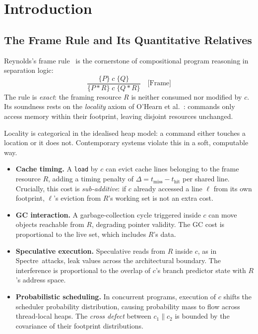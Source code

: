 \documentclass[acmsmall,sigplan,anonymous,review,screen]{acmart}
\newcommand{\inferrule}[2]{%
  \dfrac{\displaystyle #1}{\displaystyle #2}%
}
\theoremstyle{plain}
\theoremstyle{definition}
\newcommand{\sep}{*}
\begin{document}
\section{Introduction}
\label{sec:intro}

\subsection{The Frame Rule and Its Quantitative Relatives}
\label{sec:intro:frame}

Reynolds's frame rule~\cite{reynolds2002separation} is the cornerstone of
compositional program reasoning in separation logic:
\begin{equation}
  \label{eq:frame}
  \inferrule{\{P\}\;c\;\{Q\}}{\{P \sep R\}\;c\;\{Q \sep R\}} \quad\text{[Frame]}
\end{equation}
The rule is \emph{exact}: the framing resource $R$ is neither consumed
nor modified by $c$.  Its soundness rests on the \emph{locality} axiom of
O'Hearn et al.~\cite{ohearn2001local}: commands only access memory within
their footprint, leaving disjoint resources unchanged.

Locality is categorical in the idealised heap model: a command either
touches a location or it does not.  Contemporary systems violate this
in a soft, computable way.

\begin{itemize}[leftmargin=1.5em,itemsep=2pt]
  \item \textbf{Cache timing.}
    A \texttt{load} by $c$ can evict cache lines belonging to the frame
    resource $R$, adding a timing penalty of $\Delta = t_{\mathrm{miss}} -
    t_{\mathrm{hit}}$ per shared line.  Crucially, this cost is
    \emph{sub-additive}: if $c$ already accessed a line $\ell$ from its
    own footprint, $\ell$'s eviction from $R$'s working set is not an
    extra cost.
  \item \textbf{GC interaction.}  A garbage-collection cycle triggered
    inside $c$ can move objects reachable from $R$, degrading pointer
    validity.  The GC cost is proportional to the live set, which
    includes $R$'s data.
  \item \textbf{Speculative execution.}  Speculative reads from $R$ inside
    $c$, as in Spectre~attacks, leak values across the architectural
    boundary.  The interference is proportional to the overlap of $c$'s
    branch predictor state with $R$'s address space.
  \item \textbf{Probabilistic scheduling.}  In concurrent programs,
    execution of $c$ shifts the scheduler probability distribution, causing
    probability mass to flow across thread-local heaps.  The \emph{cross
    defect} between $c_1 \| c_2$ is bounded by the covariance of their
    footprint distributions.
\end{itemize}
\end{document}
